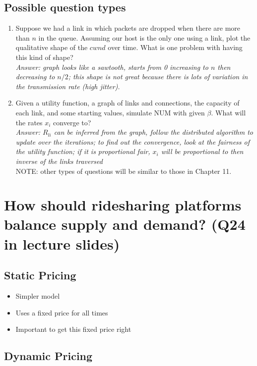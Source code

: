 \documentclass{article}
\begin{document}
\subsection{Possible question types}

\begin{enumerate}
\item Suppose we had a link in which packets are dropped when there are more than $n$ in the queue. Assuming our host is the only one using a link, plot the qualitative shape of the $cwnd$ over time. What is one problem with having this kind of shape? \\
\textit{Answer: graph looks like a sawtooth, starts from 0 increasing to $n$ then decreasing to $n/2$; this shape is not great because there is lots of variation in the transmission rate (high jitter).}
\item Given a utility function, a graph of links and connections, the capacity of each link, and some starting values, simulate NUM with given $\beta$. What will the rates $x_i$ converge to? \\
\textit{Answer: $R_{li}$ can be inferred from the graph, follow the distributed algorithm to update over the iterations; to find out the convergence, look at the fairness of the utility function; if it is proportional fair, $x_i$ will be proportional to then inverse of the links traversed} \\
NOTE: other types of questions will be similar to those in Chapter 11.
\end{enumerate}

\section{How should ridesharing platforms balance supply and demand? (Q24 in lecture slides)}

\subsection{Static Pricing}

\begin{itemize}
\item Simpler model
\item Uses a fixed price for all times
\item Important to get this fixed price right
\end{itemize}

\subsection{Dynamic Pricing}
\end{document}
